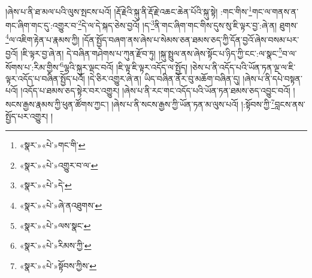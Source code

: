 །ཞེས་པ་ནི་ཐ་མལ་པའི་ལུས་སྤངས་པའོ། །རྡོ་རྗེའི་སྐུ་ནི་རྡོ་རྗེ་འཆང་ཆེན་པོའི་སྐུ་སྟེ། :གང་གིས་\footnote{«སྣར་»«པེ་»གང་གི་}གང་ལ་གནས་ན་གང་ཞིག་གང་དུ་:འགྱུར་བ་\footnote{«སྣར་»«པེ་»འགྱུར་བ་ལ་}དེ་ལ་དེ་སྐད་ཅེས་བྱའོ། །ད་\footnote{«སྣར་»«པེ་»དེ་}ནི་གང་ཞིག་གང་གིས་དུས་སུ་ཇི་ལྟར་བྱ་:ཞེ་ན། ཐུགས་\footnote{«སྣར་»«པེ་»ཞེ་ནའཐུགས་}ལ་འཇིག་རྟེན་པ་རྣམས་ཀྱི། །དོན་སྤྱོད་བཞག་ནས་ཞེས་པ་སེམས་ཅན་ཐམས་ཅད་ཀྱི་དོན་བྱའོ་ཞེས་བསམ་པར་བྱའོ། །ཇི་ལྟར་བྱ་ཞེ་ན། དེ་བཞིན་གཤེགས་པ་ཀུན་རྫོབ་ཏུ། །སྐུ་སྤྲུལ་ནས་ཞེས་སྟོང་པ་ཉིད་ཀྱི་ངང་:ལ་སྣང་\footnote{«སྣར་»«པེ་»ལས་སྣང་}བ་ལ་སོགས་པ་:རིམ་གྱིས་\footnote{«སྣར་»«པེ་»རིམས་ཀྱི་}ལྷའི་སྐུར་ལྡང་བའོ། །ཇི་ལྟ་ཇི་ལྟར་འདོད་ལ་སྤྱོད། །ཅེས་པ་ནི་འདོད་པའི་ཡོན་ཏན་ལྔ་ལ་ཇི་ལྟར་འདོད་པ་བཞིན་སྤྱོད་པའོ། །དེ་ཅིར་འགྱུར་ཞེ་ན། ཡིད་བཞིན་ནོར་བུ་མཆོག་བཞིན་དུ། །ཞེས་པ་ནི་དཔེ་བསྟན་པའོ། །འདོད་པ་ཐམས་ཅད་སྟེར་བར་འགྱུར། །ཞེས་པ་ནི་རང་གང་འདོད་པའི་ཡོན་ཏན་ཐམས་ཅད་འབྱུང་བའོ། །སངས་རྒྱས་རྣམས་ཀྱི་ཕུན་ཚོགས་ཀྱང་། །ཞེས་པ་ནི་སངས་རྒྱས་ཀྱི་ཡོན་ཏན་མ་ལུས་པའོ། །:སྟོབས་ཀྱི་\footnote{«སྣར་»«པེ་»སྟོབས་ཀྱིས་}བླངས་ནས་སྤྱོད་པར་འགྱུར། །
